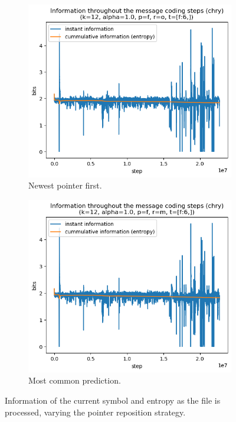 \documentclass{article}
\begin{document}
\begin{figure}
\begin{subfigure}[b]{0.3\textwidth}
\begin{center}
            \includegraphics[width=1.0\linewidth]{../scripts/images/chry_12_1.0_f_o_[f:6,].png}
        \end{center}
        \caption{Newest pointer first.}
        \label{fig:results-reposition-o}
    \end{subfigure}
    \hfill
    \begin{subfigure}[b]{0.3\textwidth}
        \begin{center}
            \includegraphics[width=1.0\linewidth]{../scripts/images/chry_12_1.0_f_m_[f:6,].png}
        \end{center}
        \caption{Most common prediction.}
        \label{fig:results-reposition-m}
    \end{subfigure}
    \caption{Information of the current symbol and entropy as the file is processed, varying the pointer reposition strategy.}
    \label{fig:results-reposition}
\end{figure}
\end{document}
